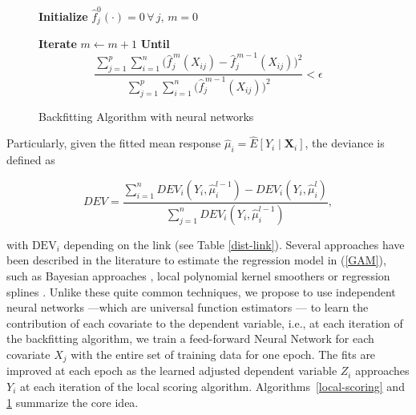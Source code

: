 \begin{figure}[ht!]

    \SetAlgoLined
    \caption{Backfitting Algorithm with neural networks}
    \label{backfitting}
        \textbf{Initialize} $\hat f_j^0(\cdot) = 0 \, \forall \, j, \, m = 0 $

        \textbf{Iterate} $m \gets m+1$
            \BlankLine
            \textbf{Until}
            \[
            \frac{ \sum_{j=1}^p \sum_{i=1}^n \bigl(\hat f_j^{\,m}(X_{ij}) - \hat f_j^{\,m-1}(X_{ij})\bigr)^2}
                 { \sum_{j=1}^p \sum_{i=1}^n \bigl(\hat f_j^{\,m-1}(X_{ij})\bigr)^2}
            < \epsilon
            \] \BlankLine
\end{figure}

Particularly, given the fitted mean response $\hat{\mu}_i = \hat E[Y_i \mid \textbf{X}_i]$, the deviance is defined as

\[DEV = \frac{\sum_{i=1}^n DEV_i(Y_i, \hat \mu_i^{l-1}) - DEV_i(Y_i, \hat \mu_i^{l})}{\sum_{j=1}^n DEV_i(Y_i, \hat \mu_i^{l-1})},
\]

\noindent with $\text{DEV}_i$ depending on the link (see Table \ref{dist-link}). Several approaches have been described in the literature to estimate the regression model in (\ref{GAM}), such as Bayesian approaches \citep{lang2004bayesian}, local polynomial kernel smoothers \citep{wand1994kernel, copeland1997local} or regression splines \citep{de1978practical}. Unlike these quite common techniques, we propose to use independent neural networks ---which are universal function estimators \citep{hornik1989multilayer}--- to learn the contribution of each covariate to the dependent variable, i.e., at each iteration of the backfitting algorithm, we train a feed-forward Neural Network for each covariate $X_j$ with the entire set of training data for one epoch. The fits are improved at each epoch as the learned adjusted dependent variable $Z_i$ approaches $Y_i$ at each iteration of the local scoring algorithm. Algorithms~\ref{local-scoring} and \ref{backfitting} summarize the core idea.

